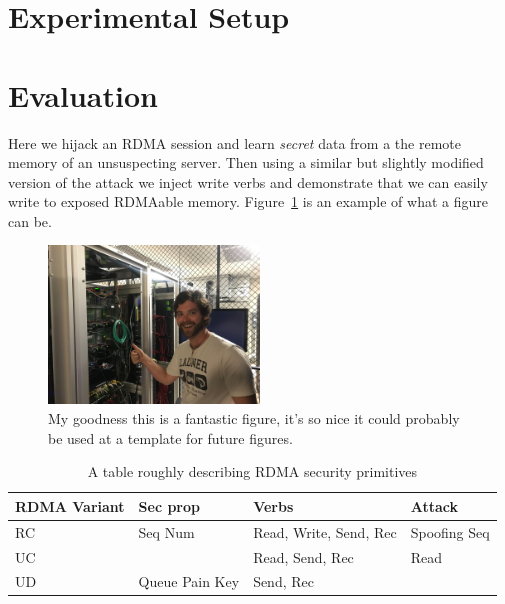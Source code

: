 \section{Experimental Setup}
\label{sec:eval}

\section{Evaluation}

Here we hijack an RDMA session and learn \emph{secret} data from a the remote
memory of an unsuspecting server. Then using a similar but slightly modified
version of the attack we inject write verbs and demonstrate that we can easily
write to exposed RDMAable memory. Figure~\ref{fig:tmp} is an example of what a
figure can be.

\begin{figure}[h]
    \includegraphics[width=0.5\textwidth]{fig/tmp.jpg}
    \centering
    \caption{My goodness this is a fantastic figure, it's so nice it could probably be used at a template for future figures.}
    \label{fig:tmp}
\end{figure}

\begin{table}
    \begin{tabular}{p{1.5cm}|p{1.5cm}|p{1.5cm}|p{1.5cm}}
        \hline
        \hline
    RDMA Variant & Sec prop & Verbs & Attack \\
        \hline
        RC & Seq Num & Read, Write, Send, Rec & Spoofing Seq \\
        \hline
        UC & & Read, Send, Rec & Read  \\
        \hline
        UD & Queue Pain Key & Send, Rec & \\
        \hline
    \end{tabular}
    \caption{A table roughly describing RDMA security primitives}
    \label{table:attacks}
\end{table}

